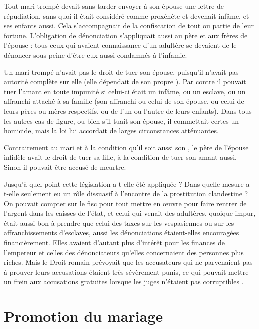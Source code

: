  Tout mari trompé devait sans tarder envoyer à son épouse une lettre de répudiation, sans quoi il était considéré comme proxénète et devenait infâme, et ses enfants aussi. Cela s'accompagnait de la confiscation de tout ou partie de leur fortune. L'obligation de dénonciation s'appliquait aussi au père et aux frères de l'épouse : tous ceux qui avaient connaissance d'un adultère se devaient de le dénoncer sous peine d'être eux aussi condamnés à l'infamie.

 Un mari trompé n'avait pas le droit de tuer son épouse, puisqu'il n'avait pas autorité complète sur elle (elle dépendait de son propre ). Par contre il pouvait tuer l'amant en toute impunité si celui-ci était un infâme, ou un esclave, ou un affranchi attaché à sa famille (son affranchi ou celui de son épouse, ou celui de leurs pères ou mères respectifs, ou de l'un ou l'autre de leurs enfants). Dans tous les autres cas de figure, ou bien s'il tuait son épouse, il commettait certes un homicide, mais la loi lui accordait de larges circonstances atténuantes. 

 Contrairement au mari et à la condition qu'il soit aussi son , le père de l'épouse infidèle avait le droit de tuer sa fille, à la condition de tuer son amant aussi. Sinon il pouvait être accusé de meurtre.

 Jusqu'à quel point cette législation a-t-elle été appliquée ? Dans quelle mesure a-t-elle seulement eu un rôle dissuasif à l'encontre de la prostitution clandestine ? On pouvait compter sur le fisc pour tout mettre en œuvre pour faire rentrer de l'argent dans les caisses de l'état, et celui qui venait des adultères, quoique impur, était aussi bon à prendre que celui des taxes sur les vespasiennes ou sur les affranchissements d'esclaves, aussi les dénonciations étaient-elles encouragées financièrement. Elles avaient d'autant plus d'intérêt pour les finances de l'empereur et celles des dénonciateurs qu'elles concernaient des personnes plus riches. Mais le Droit romain prévoyait que les accusateurs qui ne parvenaient pas à prouver leurs accusations étaient très sévèrement punis, ce qui pouvait mettre un frein aux accusations gratuites lorsque les juges n'étaient pas corruptibles . 


\section{Promotion du mariage}

